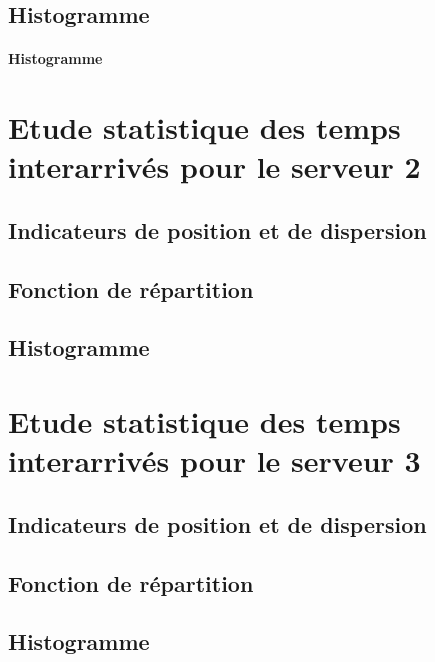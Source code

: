 \documentclass{article}
\begin{document}
\subsection{Histogramme}

\paragraph{Histogramme}
\begin{center}
\end{center}
\paragraph{}



\section{Etude statistique des temps interarrivés pour le serveur 2}

\subsection{Indicateurs de position et de dispersion}

\subsection{Fonction de répartition}

\subsection{Histogramme}


\section{Etude statistique des temps interarrivés pour le serveur 3}

\subsection{Indicateurs de position et de dispersion}

\subsection{Fonction de répartition}

\subsection{Histogramme}
\end{document}
